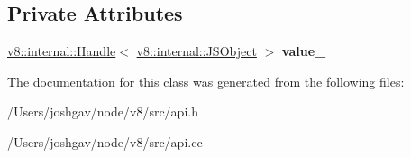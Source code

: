 \subsection*{Private Attributes}
\begin{DoxyCompactItemize}
\item 
\hyperlink{classv8_1_1internal_1_1_handle}{v8\+::internal\+::\+Handle}$<$ \hyperlink{classv8_1_1internal_1_1_j_s_object}{v8\+::internal\+::\+J\+S\+Object} $>$ {\bfseries value\+\_\+}\hypertarget{classv8_1_1_neander_object_a10750886ff30816cab441f60c2fbf2a7}{}\label{classv8_1_1_neander_object_a10750886ff30816cab441f60c2fbf2a7}

\end{DoxyCompactItemize}


The documentation for this class was generated from the following files\+:\begin{DoxyCompactItemize}
\item 
/\+Users/joshgav/node/v8/src/api.\+h\item 
/\+Users/joshgav/node/v8/src/api.\+cc\end{DoxyCompactItemize}
